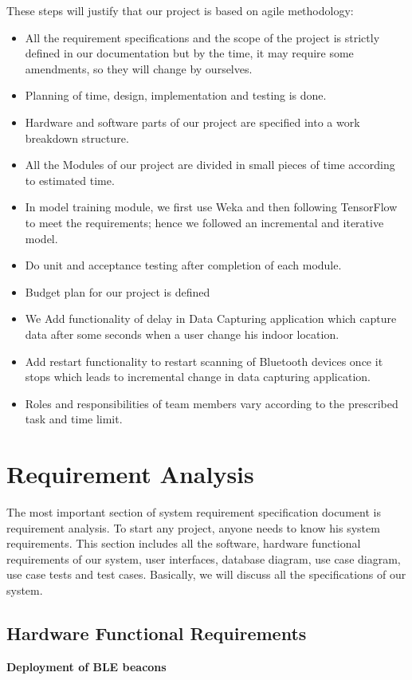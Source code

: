 These steps will justify that our project is based on agile methodology:
\begin{itemize}
\item All the requirement specifications and the scope of the project is strictly defined in our documentation but by the time, it may require some amendments, so they will change by ourselves.
\item Planning of time, design, implementation and testing is done.
\item Hardware and software parts of our project are specified into a work breakdown structure.
\item All the Modules of our project are divided in small pieces of time according to estimated time.
\item In model training module, we first use Weka and then following TensorFlow to meet the requirements; hence we followed an incremental and iterative model.
\item Do unit and acceptance testing after completion of each module.
\item Budget plan for our project is defined
\item We Add functionality of delay in Data Capturing application  which capture data after some seconds when a user change his indoor location.
\item Add restart functionality to restart scanning of Bluetooth devices once it stops which leads to incremental change in data capturing application.
\item Roles and responsibilities of team members vary according to the prescribed task and time limit.
\end{itemize}


\section{Requirement Analysis}
The most important section of system requirement specification document is requirement analysis. To start any project, anyone needs to know his system requirements. This section includes all the software, hardware functional requirements of our system, user interfaces, database diagram, use case diagram, use case tests and test cases. Basically, we will discuss all the specifications of our system.
\subsection{Hardware Functional Requirements}
\textbf{Deployment of BLE beacons}

